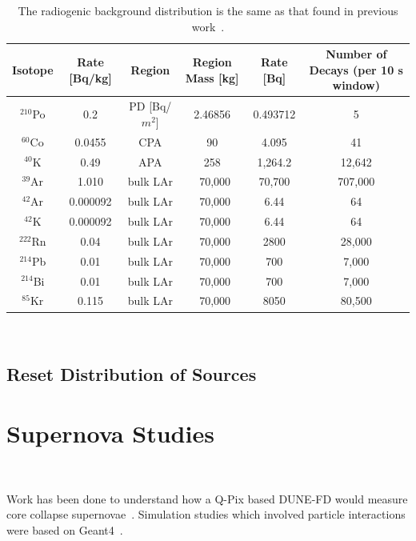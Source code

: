 \begin{table}
\begin{center}
\begin{tabular}{|c c c c c c|}
 \hline
 Isotope & Rate [Bq/kg] & Region & Region Mass [kg] & Rate [Bq] & Number of Decays (per 10 s window) \\ [0.5ex]
 \hline\hline
  $^{210}$Po & 0.2 & PD [Bq/$m^2$] & 2.46856 & 0.493712 & 5 \\
  $^{60}$Co & 0.0455 & CPA & 90 & 4.095 & 41 \\
  $^{40}$K & 0.49 & APA & 258 & 1,264.2 & 12,642 \\
  $^{39}$Ar & 1.010 & bulk LAr & ~70,000 & 70,700 & 707,000 \\
  $^{42}$Ar & 0.000092 & bulk LAr & ~70,000 & 6.44 & 64 \\
  $^{42}$K  & 0.000092 & bulk LAr & ~70,000 & 6.44 & 64 \\
  $^{222}$Rn & 0.04 & bulk LAr & ~70,000 & 2800 & 28,000 \\
  $^{214}$Pb & 0.01 & bulk LAr & ~70,000 & 700 & 7,000 \\
  $^{214}$Bi & 0.01 & bulk LAr & ~70,000 & 700 & 7,000 \\
  $^{85}$Kr & 0.115 & bulk LAr & ~70,000 & 8050 & 80,500 \\
 \hline
\end{tabular}
\caption{The radiogenic background distribution is the same as that found in previous work~\citep{qpix:shion}.}
\end{center}
\end{table}
~\label{table:radiogenic_backgrounds}


\subsection{Reset Distribution of Sources}



\section{Supernova Studies}~\label{sec:supernova}

Work has been done to understand how a Q-Pix based DUNE-FD would measure core collapse supernovae~\citep{qpix:shion}.
Simulation studies which involved particle interactions were based on Geant4~\citep{geant4:AGOSTINELLI2003250}.


